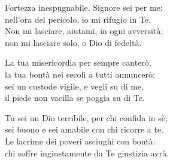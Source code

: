 
\strofa Fortezza inespugnabile, Signore sei per me:\\
nell'ora del pericolo, io mi rifugio in Te.\\
Non mi lasciare, aiutami, in ogni avversità;\\
non mi lasciare solo, o Dio di fedeltà.

\spazio

\strofa La tua misericordia per sempre canterò,\\
la tua bontà nei secoli a tutti annuncerò:\\
sei un custode vigile, e vegli su di me,\\
il piede non vacilla se poggia su di Te.

\spazio

\strofa Tu sei un Dio terribile, per chi confida in sè;\\
sei buono e sei amabile con chi ricorre a te.\\
Le lacrime dei poveri asciughi con bontà:\\
chi soffre ingiustamente da Te giustizia avrà.